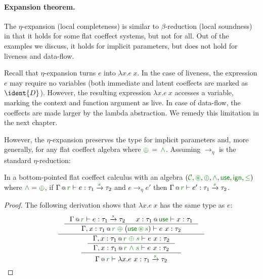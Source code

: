 \paragraph{Expansion theorem.}
The $\eta$-expansion (local completeness) is similar to $\beta$-reduction (local soundness) in that
it holds for some flat coeffect systems, but not for all. Out of the examples we discuss, it 
holds for implicit parameters, but does not hold for liveness and data-flow.

Recall that $\eta$-expansion turns $e$ into $\lambda x.e~x$. In the case of liveness, the 
expression $e$ may require no variables (both immediate and latent coeffects are marked as
$\ident{D}$). However, the resulting expression $\lambda x.e~x$ accesses a variable, 
marking the context and function argument as live. In case of data-flow, the coeffects are
made larger by the lambda abstraction. We remedy this limitation in the next chapter.

However, the $\eta$-expansion preserves the type for implicit parameters and, more generally,
for any flat coeffect algebra where $\cpar \,=\, \czip$. Assuming $\rightarrow_\eta$ is the 
standard $\eta$-reduction:

\begin{theorem}
\label{thm:cbn-substitution-bot}
In a bottom-pointed flat coeffect calculus with an algebra $(\C, \cseq, \cpar, \czip, \cunit, \czero, \cleq)$ 
where $\czip = \cpar$, if $\coctx{\Gamma}{\cclrd{r}} \vdash e : \tau_1 \xrightarrow{\cclrd{s}} \tau_2$ 
and $e \rightarrow_\eta e'$ then $\coctx{\Gamma}{\cclrd{r}} \vdash e' : \tau_1 \xrightarrow{\cclrd{s}} \tau_2 $.
\end{theorem}
\begin{proof}
The following derivation shows that $\lambda x.e~x$ has the same type as $e$:
\begin{equation*}
\inference
  { \inference
    { \coctx{\Gamma}{\cclrd{r}} \vdash e : \tau_1 \xrightarrow{\cclrd{s}} \tau_2 &
      \coctx{x:\tau_1}{\cunit} \vdash x:\tau_1 }
    { \coctx{\Gamma, x:\tau_1}{\cclrd{r} \;\cpar\; (\cunit \,\cseq\, \cclrd{s}) } \vdash e~x : \tau_2 } }
  { \inference
    { \inference
      { \coctx{\Gamma, x:\tau_1}{\cclrd{r} \;\cpar\; \cclrd{s} } \vdash e~x : \tau_2 }
      { \coctx{\Gamma, x:\tau_1}{\cclrd{r} \;\czip\; \cclrd{s} } \vdash e~x : \tau_2 } }
    { \coctx{\Gamma}{ \cclrd{r} } \vdash \lambda x.e~x : \tau_1 \xrightarrow{\cclrd{s}} \tau_2 } }
\end{equation*}
\end{proof}

